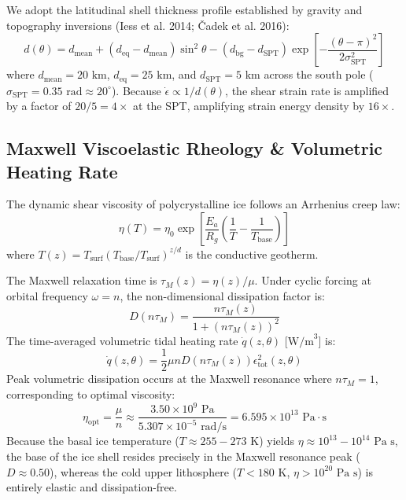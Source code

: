 \documentclass[11pt,a4paper]{article}
\begin{document}
We adopt the latitudinal shell thickness profile established by gravity and topography inversions (Iess et al. 2014; Čadek et al. 2016):
\begin{equation}
d(\theta) = d_{\text{mean}} + (d_{\text{eq}} - d_{\text{mean}})\sin^2\theta - (d_{\text{bg}} - d_{\text{SPT}})\exp\left[ -\frac{(\theta - \pi)^2}{2\sigma_{\text{SPT}}^2} \right]
\end{equation}
where $d_{\text{mean}} = 20\text{ km}$, $d_{\text{eq}} = 25\text{ km}$, and $d_{\text{SPT}} = 5\text{ km}$ across the south pole ($\sigma_{\text{SPT}} = 0.35\text{ rad} \approx 20^\circ$). Because $\dot{\epsilon} \propto 1/d(\theta)$, the shear strain rate is amplified by a factor of $20/5 = 4\times$ at the SPT, amplifying strain energy density by $16\times$.

\subsection{Maxwell Viscoelastic Rheology \& Volumetric Heating Rate}
The dynamic shear viscosity of polycrystalline ice follows an Arrhenius creep law:
\begin{equation}
\eta(T) = \eta_0 \exp\left[ \frac{E_a}{R_g} \left( \frac{1}{T} - \frac{1}{T_{\text{base}}} \right) \right]
\end{equation}
where $T(z) = T_{\text{surf}} (T_{\text{base}} / T_{\text{surf}})^{z/d}$ is the conductive geotherm.

The Maxwell relaxation time is $\tau_M(z) = \eta(z) / \mu$. Under cyclic forcing at orbital frequency $\omega = n$, the non-dimensional dissipation factor is:
\begin{equation}
D(n \tau_M) = \frac{n \tau_M(z)}{1 + (n \tau_M(z))^2}
\end{equation}
The time-averaged volumetric tidal heating rate $\dot{q}(z, \theta)$ [$\text{W/m}^3$] is:
\begin{equation}
\dot{q}(z, \theta) = \frac{1}{2} \mu n D(n \tau_M(z)) \epsilon_{\text{tot}}^2(z, \theta)
\end{equation}
Peak volumetric dissipation occurs at the Maxwell resonance where $n\tau_M = 1$, corresponding to optimal viscosity:
\begin{equation}
\eta_{\text{opt}} = \frac{\mu}{n} \approx \frac{3.50 \times 10^9\text{ Pa}}{5.307 \times 10^{-5}\text{ rad/s}} = 6.595 \times 10^{13}\text{ Pa}\cdot\text{s}
\end{equation}
Because the basal ice temperature ($T \approx 255-273\text{ K}$) yields $\eta \approx 10^{13}-10^{14}\text{ Pa s}$, the base of the ice shell resides precisely in the Maxwell resonance peak ($D \approx 0.50$), whereas the cold upper lithosphere ($T < 180\text{ K}$, $\eta > 10^{20}\text{ Pa s}$) is entirely elastic and dissipation-free.
\end{document}

